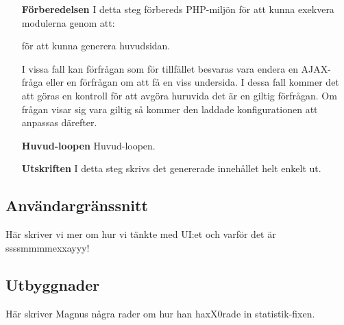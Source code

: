 \begin{itemize}
  \item[\bf Förberedelsen]
    I detta steg förbereds PHP-miljön för att kunna exekvera modulerna genom
    att:
    för att kunna generera huvudsidan.

    I vissa fall kan förfrågan som för tillfället besvaras vara endera en
    AJAX-fråga eller en förfrågan om att få en viss undersida. I dessa fall
    kommer det att göras en kontroll för att avgöra huruvida det är en giltig
    förfrågan. Om frågan visar sig vara giltig så kommer den laddade
    konfigurationen att anpassas därefter.
  \item[\bf Huvud-loopen]
    Huvud-loopen.

  \item[\bf Utskriften]
    I detta steg skrivs det genererade innehållet helt enkelt ut.
\end{itemize}

\subsection{Användargränssnitt}
\label{sec:ui}
Här skriver vi mer om hur vi tänkte med UI:et och varför det är ssssmmmmexxayyy!

\subsection{Utbyggnader}
\label{design:stats}
Här skriver Magnus några rader om hur han haxX0rade in statistik-fixen.
